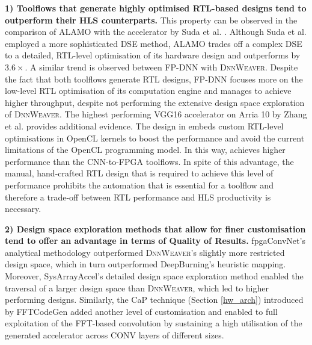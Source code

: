 \documentclass[format=acmsmall, review=false, screen=true]{acmart}
\begin{document}
\textbf{1) Toolflows that generate highly optimised RTL-based designs tend to outperform their HLS counterparts.} This property can be observed in the comparison of ALAMO with the accelerator by Suda et al. \cite{Suda_2016}. Although Suda et al. employed a more sophisticated DSE method, ALAMO trades off a complex DSE to a detailed, RTL-level optimisation of its hardware design and outperforms by $3.6 \times$. A similar trend is observed between FP-DNN with \textsc{DnnWeaver}. Despite the fact that both toolflows generate RTL designs, FP-DNN focuses more on the low-level RTL optimisation of its computation engine and manages to achieve higher throughput, despite not performing the extensive design space exploration of \textsc{DnnWeaver}. The highest performing VGG16 accelerator on Arria 10 by Zhang et al. \cite{Zhang_2017} provides additional evidence. The design in \cite{Zhang_2017} embeds custom RTL-level optimisations in OpenCL kernels to boost the performance and avoid the current limitations of the OpenCL programming model. In this way, \cite{Zhang_2017} achieves higher performance than the CNN-to-FPGA toolflows. In spite of this advantage, the manual, hand-crafted RTL design that is required to achieve this level of performance prohibits the automation that is essential for a toolflow and therefore a trade-off between RTL performance and HLS productivity is necessary.


\textbf{2) Design space exploration methods that allow for finer customisation tend to offer an advantage in terms of \mbox{Quality} of Results.} fpgaConvNet's analytical methodology outperformed \textsc{DnnWeaver}'s slightly more restricted design space, which in turn outperformed DeepBurning's heuristic mapping. Moreover, SysArrayAccel's detailed design space exploration method enabled the traversal of a larger design space than \textsc{DnnWeaver}, which led to higher performing designs. {\color{black}Similarly, the CaP technique (Section \ref{hw_arch}) introduced by FFTCodeGen added another level of customisation and enabled to full exploitation of the FFT-based convolution by sustaining a high utilisation of the generated accelerator across CONV layers of different sizes.}
\end{document}
